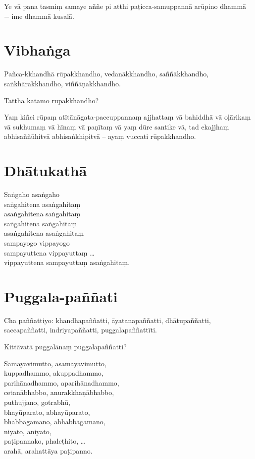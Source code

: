 Ye vā pana tasmiṃ samaye aññe pi atthi paṭicca-samuppannā arūpino dhammā − ime
dhammā kusalā.


\section{Vibhaṅga}

Pañca-kkhandhā rūpakkhandho, vedanākkhandho, saññākkhandho, saṅkhārakkhandho,
viññāṇakkhandho.

Tattha katamo rūpakkhandho?

Yaṃ kiñci rūpaṃ atītānāgata-paccuppannaṃ ajjhattaṃ vā bahiddhā vā oḷārikaṃ vā
sukhumaṃ vā hīnaṃ vā paṇītaṃ vā yaṃ dūre santike vā, tad ekajjhaṃ
abhisaññūhitvā abhisaṅkhipitvā -- ayaṃ vuccati rūpakkhandho.


\clearpage

\section{Dhātukathā}

Saṅgaho asaṅgaho\\
saṅgahitena asaṅgahitaṃ\\
asaṅgahitena saṅgahitaṃ\\
saṅgahitena saṅgahitaṃ\\
asaṅgahitena asaṅgahitaṃ\\
sampayogo vippayogo\\
sampayuttena vippayuttaṃ \ldots\\
vippayuttena sampayuttaṃ asaṅgahitaṃ.


\section{Puggala-paññati}

Cha paññattiyo: khandhapaññatti, āyatanapaññatti, dhātupaññatti, saccapaññatti,
indriyapaññatti, puggalapaññattīti.

Kittāvatā puggalānaṃ puggalapaññatti?

Samayavimutto, asamayavimutto,\\
kuppadhammo, akuppadhammo,\\
parihānadhammo, aparihānadhammo,\\
cetanābhabbo, anurakkhaṇābhabbo,\\
puthujjano, gotrabhū,\\
bhayūparato, abhayūparato,\\
bhabbāgamano, abhabbāgamano,\\
niyato, aniyato,\\
paṭipannako, phaleṭhito, \ldots\\
arahā, arahattāya paṭipanno.

